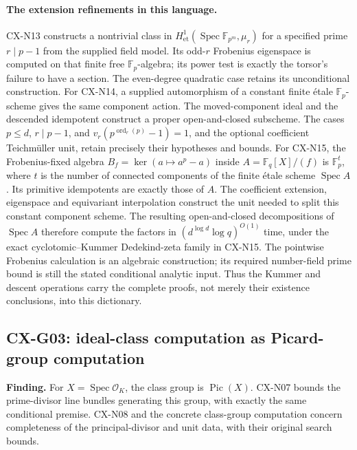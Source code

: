 \documentclass[11pt,a4paper]{article}
\begin{document}
\paragraph{The extension refinements in this language.}
CX-N13 constructs a nontrivial class in
$H^1_{\mathrm{et}}(\operatorname{Spec}\mathbb F_{p^m},\mu_r)$
for a specified prime $r\mid p-1$ from the supplied field model.
Its odd-$r$ Frobenius eigenspace is computed on that finite free
$\mathbb F_p$-algebra; its power test is exactly the torsor's
failure to have a section. The even-degree quadratic case retains
its unconditional construction.
For CX-N14, a supplied automorphism of a constant finite étale
$\mathbb F_p$-scheme gives the same component action. The moved-component
ideal and the descended idempotent construct a proper open-and-closed
subscheme. The cases $p\le d$, $r\mid p-1$, and
$v_r(p^{\operatorname{ord}_r(p)}-1)=1$, and the optional coefficient
Teichmüller unit, retain precisely their hypotheses and bounds.
For CX-N15, the Frobenius-fixed algebra
$B_f=\ker(a\mapsto a^p-a)$ inside
$A=\mathbb F_q[X]/(f)$ is $\mathbb F_p^t$, where $t$ is the number
of connected components of the finite étale scheme $\operatorname{Spec}A$.
Its primitive idempotents are exactly those of $A$.
The coefficient extension, eigenspace and equivariant interpolation
construct the unit needed to split this constant component scheme.
The resulting open-and-closed decompositions of $\operatorname{Spec}A$
therefore compute the factors in
$(d^{\log d}\log q)^{O(1)}$ time, under the exact cyclotomic--Kummer
Dedekind-zeta family in CX-N15. The pointwise Frobenius calculation is
an algebraic construction; its required number-field prime bound is
still the stated conditional analytic input.
Thus the Kummer and descent operations carry the complete proofs,
not merely their existence conclusions, into this dictionary.

\subsection{CX-G03: ideal-class computation as Picard-group computation}
\label{finding:CX-G03}

\textbf{Finding.} For $X=\operatorname{Spec}\mathcal O_K$,
the class group is $\operatorname{Pic}(X)$.  CX-N07 bounds the prime-divisor
line bundles generating this group, with exactly the same conditional
premise.  CX-N08 and the concrete class-group computation concern completeness
of the principal-divisor and unit data, with their original search bounds.
\end{document}
